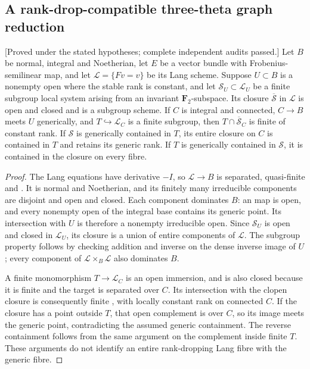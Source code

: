 \subsection{A rank-drop-compatible three-theta graph reduction}

\begin{lemma}
\label{lem:normal-base-clopen-Lang-closure-candidate}
\textup{[Proved under the stated hypotheses; complete independent audits passed.]}
Let $B$ be normal, integral and Noetherian, let $E$ be a vector bundle
with Frobenius-semilinear map, and let $\mathcal L=\{Fv=v\}$ be its
Lang scheme. Suppose $U\subset B$ is a nonempty open where the stable
rank is constant, and let $\mathcal S_U\subset\mathcal L_U$ be a
finite \etale subgroup local system arising from an invariant
$\mathbf F_2$-subspace. Its closure $\overline{\mathcal S}$ in
$\mathcal L$ is open and closed and is a subgroup scheme.
If $C$ is integral and connected, $C\to B$ meets $U$ generically,
and $T\hookrightarrow\mathcal L_C$ is a finite \etale subgroup,
then $T\cap\overline{\mathcal S}_C$ is finite \etale of constant
rank. If $\mathcal S$ is generically contained in $T$, its entire
closure on $C$ is contained in $T$ and retains its generic rank.
If $T$ is generically contained in $\mathcal S$, it is contained
in the closure on every fibre.
\end{lemma}
\begin{proof}
The Lang equations have derivative $-I$, so $\mathcal L\to B$ is
separated, quasi-finite and \etale. It is normal and Noetherian,
and its finitely many irreducible components are disjoint and open
and closed. Each component dominates $B$: an \etale map is open,
and every nonempty open of the integral base contains its generic
point. Its intersection with $U$ is therefore a nonempty irreducible
open. Since $\mathcal S_U$ is open and closed in $\mathcal L_U$,
its closure is a union of entire components of $\mathcal L$.
The subgroup property follows by checking addition and inverse on
the dense inverse image of $U$; every component of
$\mathcal L\times_B\mathcal L$ also dominates $B$.

A finite \etale monomorphism $T\to\mathcal L_C$ is an open immersion,
and is also closed because it is finite and the target is separated
over $C$. Its intersection with the clopen closure is consequently
finite \etale, with locally constant rank on connected $C$.
If the closure has a point outside $T$, that open complement is
\etale over $C$, so its image meets the generic point, contradicting
the assumed generic containment. The reverse containment follows
from the same argument on the complement inside finite \etale $T$.
These arguments do not identify an entire rank-dropping Lang fibre
with the generic fibre.
\end{proof}

